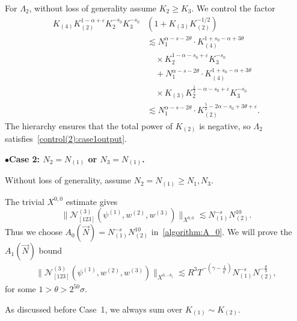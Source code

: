 \documentclass[11pt,reqno,english]{amsart}
\numberwithin{equation}{section}
\theoremstyle{plain}
\theoremstyle{definition}
\theoremstyle{remark}
\renewcommand{\epsilon}{\varepsilon}
\newcommand{\noi}{\noindent}
\begin{document}
For $\Lambda_2$, without loss of generality assume $K_2\geq K_3$. We control the factor
\begin{align*}
	K_{(4)}K_{(2)}^{1-\alpha+\epsilon}K_2^{-s_0}K_3^{-s_0}&(1+K_{(3)}K_{(2)}^{-1/2})\\
	&\lesssim N_1^{\alpha-s-2\theta}\cdot K_{(4)}^{1+s_0-\alpha+3\theta}\\
	&\quad\times K_2^{1-\alpha-s_0+\epsilon}K_3^{-s_0}\\
	&\quad+ N_1^{\alpha-s-2\theta}\cdot K_{(4)}^{1+s_0-\alpha+3\theta}\\
	&\quad\times K_{(3)}K_2^{\frac{1}{2}-\alpha-s_0+\epsilon}K_3^{-s_0}\\
	&\lesssim N_1^{\alpha-s-2\theta}\cdot K_{(2)}^{\frac{5}{2}-2\alpha-s_0+3\theta+\epsilon}.
\end{align*}
The hierarchy ensures that the total power of $K_{(2)}$ is negative, so $\Lambda_2$ satisfies~\eqref{control(2):case1output}.


\medskip

\noi
$\bullet${\bf Case 2: $N_2= N_{(1)}$ or $N_3=N_{(1)}$.}

Without loss of generality, assume $N_2=N_{(1)}\geq N_1, N_3$.

The trivial $X^{0,0}$ estimate gives
\[
\|\mathcal{N}_{[123]}^{(3)}(\psi^{(1)},w^{(2)},w^{(3)})\|_{X^{0,0}}\lesssim N_{(1)}^{-s}N_{(2)}^{10}.
\]
Thus we choose $A_0(\vec{N})=N_{(1)}^{-s}N_{(2)}^{10}$ in~\eqref{algorithm:A_0}. We will prove the $A_1(\vec{N})$ bound
\begin{align}\label{pf(2)A1boundcase2}
	\|\mathcal{N}^{(3)}_{[123]}(\psi^{(1)},w^{(2)},w^{(3)})\|_{X^{0,-b_1}}\lesssim R^3 T^{-(\gamma-\frac{1}{q'})}N_{(1)}^{-s}N_{(2)}^{-\frac{\theta}{3}},
\end{align}
for some $1>\theta>2^{50}\sigma$.

As discussed before Case~1, we always sum over $K_{(1)}\sim K_{(2)}$.
\end{document}
